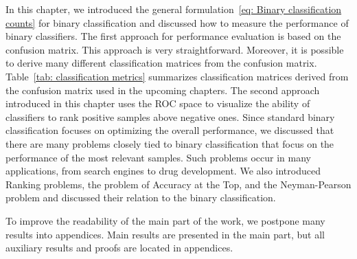 In this chapter, we introduced the general formulation~\eqref{eq: Binary classification counts} for binary classification and discussed how to measure the performance of binary classifiers. The first approach for performance evaluation is based on the confusion matrix. This approach is very straightforward. Moreover, it is possible to derive many different classification matrices from the confusion matrix. Table~\ref{tab: classification metrics} summarizes classification matrices derived from the confusion matrix used in the upcoming chapters. The second approach introduced in this chapter uses the ROC space to visualize the ability of classifiers to rank positive samples above negative ones. Since standard binary classification focuses on optimizing the overall performance, we discussed that there are many problems closely tied to binary classification that focus on the performance of the most relevant samples. Such problems occur in many applications, from search engines to drug development. We also introduced Ranking problems, the problem of Accuracy at the Top, and the Neyman-Pearson problem and discussed their relation to the binary classification.

\begin{note}
  To improve the readability of the main part of the work, we postpone many results into appendices. Main results are presented in the main part, but all auxiliary results and proofs are located in appendices.
\end{note}
